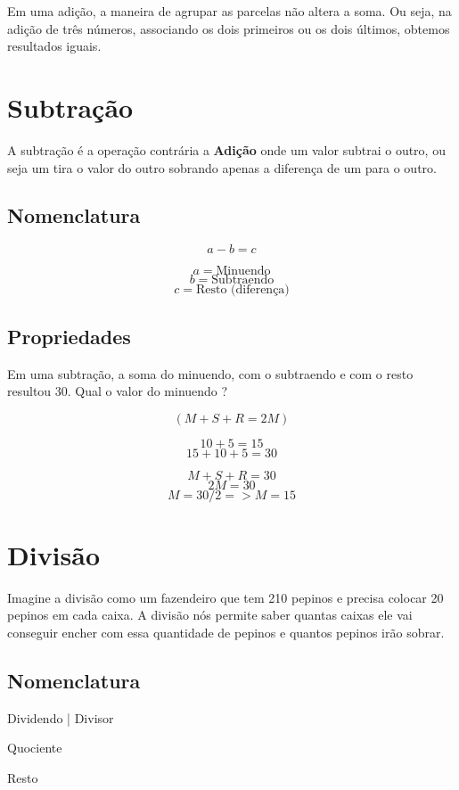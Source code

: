 \documentclass[letterpaper]{book}
\begin{document}
\vspace{0.5em}
Em uma adição, a maneira de agrupar as parcelas não altera a soma. Ou seja, na adição de três números, associando os dois primeiros ou os dois últimos, obtemos resultados iguais.

\section{Subtração}

A subtração é a operação contrária a \textbf{Adição}
onde um valor subtrai o outro, ou seja um tira o valor do outro sobrando apenas a diferença de um para o outro.

\subsection{Nomenclatura}

\[a - b = c\]

\[a  = \text{Minuendo}\]
\[b = \text{Subtraendo}\]
\[c = \text{Resto (diferença)}\]

\subsection{Propriedades}

Em uma subtração, a soma do minuendo, com o subtraendo e com o resto resultou 30. Qual o valor do minuendo ? 


\[(M + S + R = 2M)\]

\[10 + 5 = 15\]
\[15 + 10 + 5 = 30\]

\[M + S + R = 30\]
\[2M = 30\]
\[M = 30/2 => M = 15\]


\section{Divisão}

Imagine a divisão como um fazendeiro que tem 210 pepinos e precisa colocar 20 pepinos em cada caixa. A divisão nós permite saber quantas caixas ele vai conseguir encher com essa quantidade de pepinos e quantos pepinos irão sobrar.



\subsection{Nomenclatura}
Dividendo | Divisor

Quociente

Resto
\end{document}
